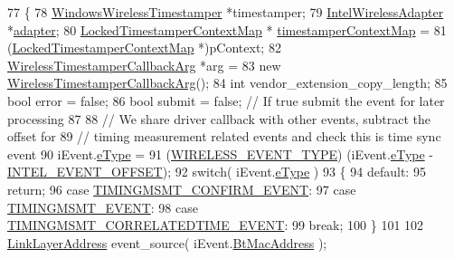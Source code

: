 \begin{DoxyCode}
77 \{
78     \hyperlink{class_windows_wireless_timestamper}{WindowsWirelessTimestamper} *timestamper;
79     \hyperlink{class_intel_wireless_adapter}{IntelWirelessAdapter} *\hyperlink{structadapter}{adapter};
80     \hyperlink{class_locked_timestamper_context_map}{LockedTimestamperContextMap} *
      \hyperlink{intel__wireless_8cpp_a6308a285d09ed3d9d4a00645a386adad}{timestamperContextMap} =
81         (\hyperlink{class_locked_timestamper_context_map}{LockedTimestamperContextMap} *)pContext;
82     \hyperlink{struct_wireless_timestamper_callback_arg}{WirelessTimestamperCallbackArg} *arg =
83         \textcolor{keyword}{new} \hyperlink{struct_wireless_timestamper_callback_arg}{WirelessTimestamperCallbackArg}();
84     \textcolor{keywordtype}{int} vendor\_extension\_copy\_length;
85     \textcolor{keywordtype}{bool} error = \textcolor{keyword}{false};
86     \textcolor{keywordtype}{bool} submit = \textcolor{keyword}{false}; \textcolor{comment}{// If true submit the event for later processing}
87 
88     \textcolor{comment}{// We share driver callback with other events, subtract the offset for}
89     \textcolor{comment}{// timing measurement related events and check this is time sync event}
90     iEvent.\hyperlink{struct_i_n_t_e_l___e_v_e_n_t_adfd2791bfb7c2d0237bbe21117619d0b}{eType} =
91         (\hyperlink{wireless__tstamper_8hpp_af5e1de4a157974fc2825521b20b357b1}{WIRELESS\_EVENT\_TYPE}) (iEvent.\hyperlink{struct_i_n_t_e_l___e_v_e_n_t_adfd2791bfb7c2d0237bbe21117619d0b}{eType} - 
      \hyperlink{intel__wireless_8cpp_ab2e9e929be21f1abca41c8575cc60269}{INTEL\_EVENT\_OFFSET});
92     \textcolor{keywordflow}{switch}( iEvent.\hyperlink{struct_i_n_t_e_l___e_v_e_n_t_adfd2791bfb7c2d0237bbe21117619d0b}{eType} )
93     \{
94     \textcolor{keywordflow}{default}:
95         \textcolor{keywordflow}{return};
96     \textcolor{keywordflow}{case} \hyperlink{wireless__tstamper_8hpp_a26f76f9ae9b26301e7413c7c9dde0f55a01aeb117c93ff9d453a8c214c5249546}{TIMINGMSMT\_CONFIRM\_EVENT}:
97     \textcolor{keywordflow}{case} \hyperlink{wireless__tstamper_8hpp_a26f76f9ae9b26301e7413c7c9dde0f55a8aa075336d9d96128556db5f9795698a}{TIMINGMSMT\_EVENT}:
98     \textcolor{keywordflow}{case} \hyperlink{wireless__tstamper_8hpp_a26f76f9ae9b26301e7413c7c9dde0f55aaf429c02023de1f759bc6d9814789ad4}{TIMINGMSMT\_CORRELATEDTIME\_EVENT}:
99         \textcolor{keywordflow}{break};
100     \}
101 
102     \hyperlink{class_link_layer_address}{LinkLayerAddress} event\_source( iEvent.\hyperlink{struct_i_n_t_e_l___e_v_e_n_t_a0fd0944150b35bbbb46236f7dfca2120}{BtMacAddress} );

\end{DoxyCode}
